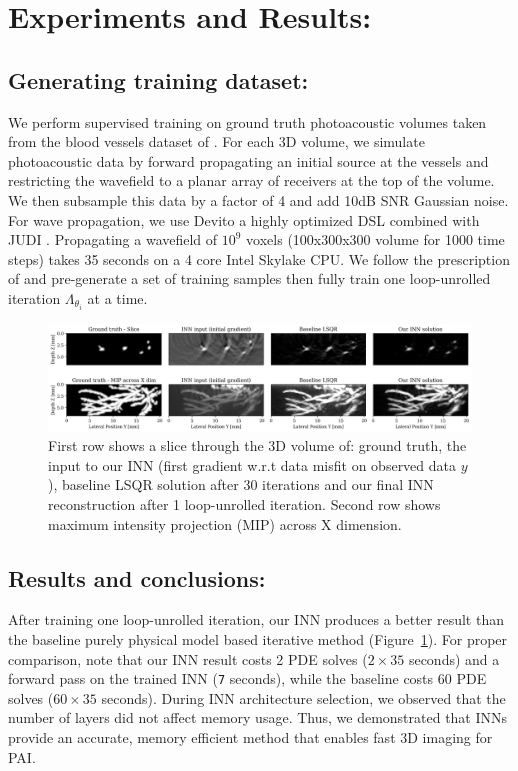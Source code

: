 \documentclass[]{article}
\begin{document}
\section{Experiments and Results:}\label{experiments-and-results}

\subsection{Generating training
dataset:}\label{generating-training-dataset}

We perform supervised training on ground truth photoacoustic volumes
taken from the blood vessels dataset of \cite{bench2020toward}. For each
3D volume, we simulate photoacoustic data by forward propagating an
initial source at the vessels and restricting the wavefield to a planar
array of receivers at the top of the volume. We then subsample this data
by a factor of 4 and add 10dB SNR Gaussian noise. For wave propagation,
we use Devito a highly optimized DSL \citet{louboutin2019devito}
combined with JUDI \citet{witte2019large}. Propagating a wavefield of
$10^9$ voxels (100x300x300 volume for 1000 time steps) takes 35 seconds
on a 4 core Intel Skylake CPU. We follow the prescription of
\citet{hauptmann2018model} and pre-generate a set of training samples
then fully train one loop-unrolled iteration $\Lambda_{\theta_i}$ at a
time.

\begin{figure}
\centering
\includegraphics[width=1.000\hsize]{Figures/results.png}
\caption{First row shows a slice through the 3D volume of: ground truth,
the input to our INN (first gradient w.r.t data misfit on observed data
$y$), baseline LSQR solution after 30 iterations and our final INN
reconstruction after 1 loop-unrolled iteration. Second row shows maximum
intensity projection (MIP) across X dimension.}\label{fig:results}
\end{figure}

\subsection{Results and conclusions:}\label{results-and-conclusions}

After training one loop-unrolled iteration, our INN produces a better
result than the baseline purely physical model based iterative method
(Figure~\ref{fig:results}). For proper comparison, note that our INN
result costs 2 PDE solves ($2 \times 35$ seconds) and a forward pass on
the trained INN (\texttt{7} seconds), while the baseline costs $60$ PDE
solves ($60 \times 35$ seconds). During INN architecture selection, we
observed that the number of layers did not affect memory usage. Thus, we
demonstrated that INNs provide an accurate, memory efficient method that
enables fast 3D imaging for PAI.


\end{document}
